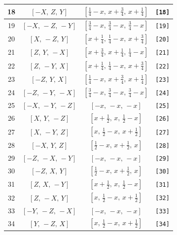 \documentclass[fleqn,8pt]{jsarticle}
\begin{document}
\begin{longtable}{cccc}
18 & $\left[ - X,\, Z,\, Y \right]$ & $\left[ \frac{1}{4} - x,\, x + \frac{3}{4},\, x + \frac{1}{4} \right]$ & {\tt [18]} \\ \hline
19 & $\left[ - X,\, - Z,\, - Y \right]$ & $\left[ \frac{3}{4} - x,\, \frac{3}{4} - x,\, \frac{3}{4} - x \right]$ & {\tt [19]} \\ \hline
20 & $\left[ X,\, - Z,\, Y \right]$ & $\left[ x + \frac{1}{4},\, \frac{1}{4} - x,\, x + \frac{3}{4} \right]$ & {\tt [20]} \\ \hline
21 & $\left[ Z,\, Y,\, - X \right]$ & $\left[ x + \frac{3}{4},\, x + \frac{1}{4},\, \frac{1}{4} - x \right]$ & {\tt [21]} \\ \hline
22 & $\left[ Z,\, - Y,\, X \right]$ & $\left[ x + \frac{1}{4},\, \frac{1}{4} - x,\, x + \frac{3}{4} \right]$ & {\tt [22]} \\ \hline
23 & $\left[ - Z,\, Y,\, X \right]$ & $\left[ \frac{1}{4} - x,\, x + \frac{3}{4},\, x + \frac{1}{4} \right]$ & {\tt [23]} \\ \hline
24 & $\left[ - Z,\, - Y,\, - X \right]$ & $\left[ \frac{3}{4} - x,\, \frac{3}{4} - x,\, \frac{3}{4} - x \right]$ & {\tt [24]} \\ \hline
25 & $\left[ - X,\, - Y,\, - Z \right]$ & $\left[ - x,\, - x,\, - x \right]$ & {\tt [25]} \\ \hline
26 & $\left[ X,\, Y,\, - Z \right]$ & $\left[ x + \frac{1}{2},\, x,\, \frac{1}{2} - x \right]$ & {\tt [26]} \\ \hline
27 & $\left[ X,\, - Y,\, Z \right]$ & $\left[ x,\, \frac{1}{2} - x,\, x + \frac{1}{2} \right]$ & {\tt [27]} \\ \hline
28 & $\left[ - X,\, Y,\, Z \right]$ & $\left[ \frac{1}{2} - x,\, x + \frac{1}{2},\, x \right]$ & {\tt [28]} \\ \hline
29 & $\left[ - Z,\, - X,\, - Y \right]$ & $\left[ - x,\, - x,\, - x \right]$ & {\tt [29]} \\ \hline
30 & $\left[ - Z,\, X,\, Y \right]$ & $\left[ \frac{1}{2} - x,\, x + \frac{1}{2},\, x \right]$ & {\tt [30]} \\ \hline
31 & $\left[ Z,\, X,\, - Y \right]$ & $\left[ x + \frac{1}{2},\, x,\, \frac{1}{2} - x \right]$ & {\tt [31]} \\ \hline
32 & $\left[ Z,\, - X,\, Y \right]$ & $\left[ x,\, \frac{1}{2} - x,\, x + \frac{1}{2} \right]$ & {\tt [32]} \\ \hline
33 & $\left[ - Y,\, - Z,\, - X \right]$ & $\left[ - x,\, - x,\, - x \right]$ & {\tt [33]} \\ \hline
34 & $\left[ Y,\, - Z,\, X \right]$ & $\left[ x,\, \frac{1}{2} - x,\, x + \frac{1}{2} \right]$ & {\tt [34]} \\ \hline

\end{longtable}
\end{document}
